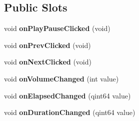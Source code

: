 \subsection*{Public Slots}
\begin{DoxyCompactItemize}
\item 
\hypertarget{class_controls_ae5e221035bf36156c77c629fe4be453d}{void {\bfseries on\-Play\-Pause\-Clicked} (void)}\label{class_controls_ae5e221035bf36156c77c629fe4be453d}

\item 
\hypertarget{class_controls_a48610eb52367be6c7509457244821335}{void {\bfseries on\-Prev\-Clicked} (void)}\label{class_controls_a48610eb52367be6c7509457244821335}

\item 
\hypertarget{class_controls_a4e7c1ea477ffeb066399d48404ede8b0}{void {\bfseries on\-Next\-Clicked} (void)}\label{class_controls_a4e7c1ea477ffeb066399d48404ede8b0}

\item 
\hypertarget{class_controls_af599078654027314f33d922ce601a054}{void {\bfseries on\-Volume\-Changed} (int value)}\label{class_controls_af599078654027314f33d922ce601a054}

\item 
\hypertarget{class_controls_a09f5f92331f2531ead8a02612ae60127}{void {\bfseries on\-Elapsed\-Changed} (qint64 value)}\label{class_controls_a09f5f92331f2531ead8a02612ae60127}

\item 
\hypertarget{class_controls_a7abbbb170c237e803401311c012492ba}{void {\bfseries on\-Duration\-Changed} (qint64 value)}\label{class_controls_a7abbbb170c237e803401311c012492ba}

\end{DoxyCompactItemize}
